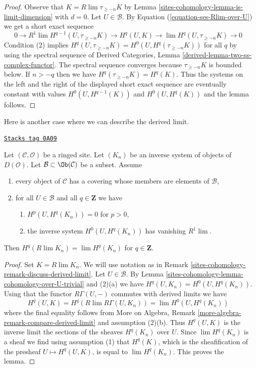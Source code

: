 \begin{proof}
Observe that $K = R\lim \tau_{\geq -n} K$ by
Lemma \ref{sites-cohomology-lemma-is-limit-dimension} with $d = 0$.
Let $U \in \mathcal{B}$. By Equation (\ref{equation-ses-Rlim-over-U})
we get a short exact sequence
$$
0 \to R^1\lim H^{q - 1}(U, \tau_{\geq -n}K) \to
H^q(U, K) \to \lim H^q(U, \tau_{\geq -n}K) \to 0
$$
Condition (2) implies
$H^q(U, \tau_{\geq -n} K) = H^0(U, H^q(\tau_{\geq -n} K))$
for all $q$ by using the spectral sequence of
Derived Categories, Lemma \ref{derived-lemma-two-ss-complex-functor}.
The spectral sequence converges because $\tau_{\geq -n}K$ is bounded
below. If $n > -q$ then we have $H^q(\tau_{\geq -n}K) = H^q(K)$.
Thus the systems on the left and the right of the displayed
short exact sequence are eventually constant with values
$H^0(U, H^{q - 1}(K))$ and $H^0(U, H^q(K))$ and the lemma follows.
\end{proof}

Here is another case where we can describe the derived limit.

\begin{lemma}
\label{sites-cohomology-lemma-derived-limit-suitable-system}
\href{https://stacks.math.columbia.edu/tag/0A09}{\texttt{Stacks tag 0A09}}

Let $(\mathcal{C}, \mathcal{O})$ be a ringed site. Let $(K_n)$
be an inverse system of objects of $D(\mathcal{O})$.
Let $\mathcal{B} \subset \Ob(\mathcal{C})$ be a subset. Assume
\begin{enumerate}
\item every object of $\mathcal{C}$ has a covering whose members are
elements of $\mathcal{B}$,
\item for all $U \in \mathcal{B}$ and all $q \in \mathbf{Z}$ we have
\begin{enumerate}
\item $H^p(U, H^q(K_n)) = 0$ for $p > 0$,
\item the inverse system $H^0(U, H^q(K_n))$ has vanishing $R^1\lim$.
\end{enumerate}
\end{enumerate}
Then $H^q(R\lim K_n) = \lim H^q(K_n)$ for $q \in \mathbf{Z}$.
\end{lemma}

\begin{proof}
Set $K = R\lim K_n$. We will use notation as in
Remark \ref{sites-cohomology-remark-discuss-derived-limit}. Let $U \in \mathcal{B}$.
By Lemma \ref{sites-cohomology-lemma-cohomology-over-U-trivial} and (2)(a)
we have $H^q(U, K_n) = H^0(U, H^q(K_n))$.
Using that the functor $R\Gamma(U, -)$ commutes with
derived limits we have
$$
H^q(U, K) = H^q(R\lim R\Gamma(U, K_n)) = \lim H^0(U, H^q(K_n))
$$
where the final equality follows from
More on Algebra, Remark \ref{more-algebra-remark-compare-derived-limit}
and assumption (2)(b). Thus $H^q(U, K)$ is the inverse limit
the sections of the sheaves $H^q(K_n)$ over $U$. Since
$\lim H^q(K_n)$ is a sheaf we find using assumption (1) that $H^q(K)$,
which is the sheafification of the presheaf $U \mapsto H^q(U, K)$,
is equal to $\lim H^q(K_n)$. This proves the lemma.
\end{proof}

